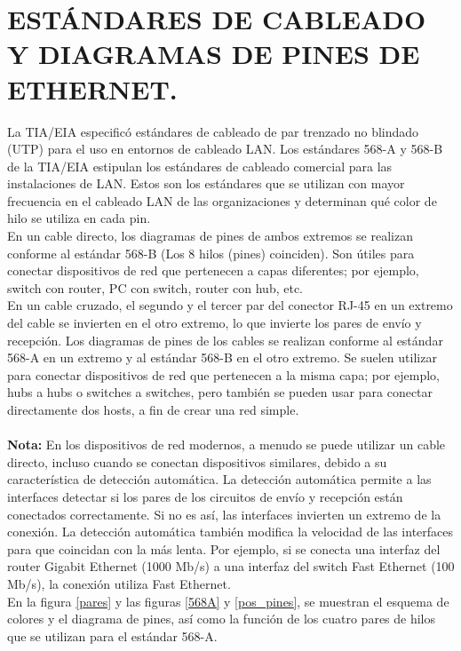 \documentclass[journal]{IEEEtran}
\begin{document}
\section{ESTÁNDARES DE CABLEADO Y DIAGRAMAS DE PINES DE ETHERNET.}
La TIA/EIA especificó estándares de cableado de par trenzado no blindado (UTP) para el uso en entornos de cableado LAN. Los estándares 568-A y 568-B de la TIA/EIA estipulan los estándares de cableado comercial para las instalaciones de LAN. Estos son los estándares que se utilizan con mayor frecuencia en el cableado LAN de las organizaciones y determinan qué color de hilo se utiliza en cada pin.\\
En un cable directo, los diagramas de pines de ambos extremos se realizan conforme al estándar 568-B (Los 8 hilos (pines) coinciden). Son útiles para conectar dispositivos de red que pertenecen a capas diferentes; por ejemplo, switch con router, PC con switch, router con hub, etc.\\
En un cable cruzado, el segundo y el tercer par del conector RJ-45 en un extremo del cable se invierten en el otro extremo, lo que invierte los pares de envío y recepción. Los diagramas de pines de los cables se realizan conforme al estándar 568-A en un extremo y al estándar 568-B en el otro extremo. Se suelen utilizar para conectar dispositivos de red que pertenecen a la misma capa; por ejemplo, hubs a hubs o switches a switches, pero también se pueden usar para conectar directamente dos hosts, a fin de crear una red simple.\\ \\
\large
\textbf{Nota:} 
\normalsize
En los dispositivos de red modernos, a menudo se puede utilizar un cable directo, incluso cuando se conectan dispositivos similares, debido a su característica de detección automática. La detección automática permite a las interfaces detectar si los pares de los circuitos de envío y recepción están conectados correctamente. Si no es así, las interfaces invierten un extremo de la conexión. La detección automática también modifica la velocidad de las interfaces para que coincidan con la más lenta. Por ejemplo, si se conecta una interfaz del router Gigabit Ethernet (1000 Mb/s) a una interfaz del switch Fast Ethernet (100 Mb/s), la conexión utiliza Fast Ethernet.\\

En la figura \ref{pares} y las figuras \ref{568A} y \ref{pos_pines}, se muestran el esquema de colores y el diagrama de pines, así como la función de los cuatro pares de hilos que se utilizan para el estándar 568-A.
\end{document}
